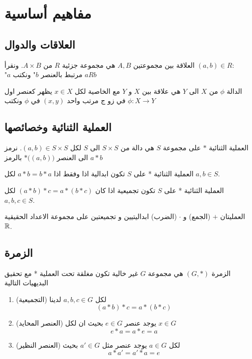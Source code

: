 \chapter{مفاهيم أساسية}

\section{العلاقات والدوال}

\begin{definition}
	العلاقة بين مجموعتين $A, B$ هي مجموعة جزئية $R$ من $A\times B$. ونقرأ $(a, b)\in R$:\\
	"$a$ مرتبط بالعنصر $b$"
	ونكتب $aRb$
\end{definition}

\begin{definition}
	الدالة $\phi$ من $X$ الى $Y$ هي علاقة بين $X$ و $Y$ مع الخاصية لكل $x\in X$ يظهر كعنصر اول في زو ج مرتب واحد $(x, y)$ في $\phi$ ونكتب $\phi:X\to Y$
\end{definition}

\section{العملية الثنائية وخصائصها}

\begin{definition}
	العملية الثنائية $*$ على مجموعة $S$ هي دالة من $S\times S$ الى $S$ لكل $(a,b) \in S\times S$. نرمز الى العنصر $*\big((a, b)\big)$ بالرمز $a*b$
\end{definition}

\begin{definition}
	العملية الثنائية * على $S$ تكون ابدالية اذا وفقط اذا $a*b = b*a$ لكل $a, b\in S$.
\end{definition}

\begin{definition}
	العملية الثنائية * على $S$ تكون تجميعية اذا كان $(a*b)*c = a*(b*c)$ لكل $a, b, c\in S$.
\end{definition}

\begin{example}
	العمليتان $+$ (الجمع) و $\cdot$ (الضرب) ابداليتيين و تجميعتين على مجموعة الاعداد الحقيقية $\mathbb{R}$.
\end{example}

\section{الزمرة}

\begin{definition}
	الزمرة $(G, *)$ هي مجموعة $G$ غير خالية تكون مغلقة تحت العملية * مع تحقيق البديهيات التالية
	\begin{enumerate}
		\item (التجميعية) لكل $a, b, c\in G$ لدينا
		\[
		(a*b) * c = a*(b*c)
		\]
		\item (العنصر المحايد) يوجد عنصر $e\in G$ بحيث ان لكل $x\in G$ 
		\[
		e * a = a * e = a
		\]
		\item (العنصر النظير)  لكل $a\in G$ يوجد عنصر مثل $a' \in G$ بحيث 
		\[
		a * a' = a' * a = e
		\]
	\end{enumerate}
\end{definition}


